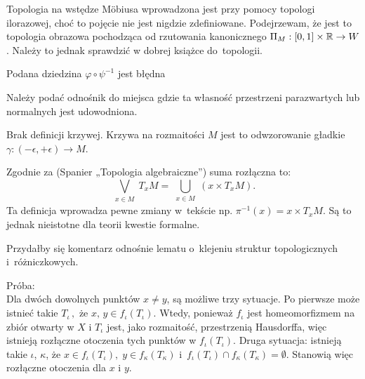 \documentclass[a4paper,11pt]{article}
\begin{document}
\vspace{\spaceFour}



\start {} Topologia na wstędze M\"{o}biusa wprowadzona jest przy
pomocy topologi ilorazowej, choć to pojęcie nie jest nigdzie
zdefiniowane. Podejrzewam, że jest to topologia obrazowa pochodząca od
rzutowania kanonicznego
$\Pi_{ M } : [ 0,1 ] \times \mathbb{R} \to W$. Należy to jednak
sprawdzić w dobrej książce do~topologii.

\vspace{\spaceFour}



\start {} Podana dziedzina $\varphi \circ \psi^{ -1 }$ jest
błędna 

\vspace{\spaceFour}



\start {} Należy podać odnośnik do miejsca gdzie ta własność
przestrzeni parazwartych lub normalnych jest udowodniona.

\vspace{\spaceFour}



\start {} Brak definicji krzywej. Krzywa na rozmaitości $M$ jest
to odwzorowanie gładkie $\gamma : ( -\epsilon, +\epsilon ) \to M$.

\vspace{\spaceFour}



\start {} Zgodnie za \cite{} (Spanier „Topologia algebraiczne”) suma
rozłączna to:
\begin{equation}
  \label{eq:GancarzewiczZWGR-s01-01}
  \bigvee_{ \substack{ x \in M } } T_{ x } M
  = \bigcup_{ \substack{ x \in M } }( x \times T_{ x } M ).
\end{equation}
Ta definicja wprowadza pewne zmiany w~tekście np.
$\pi^{ -1 }( x ) = x \times T_{ x }M$. Są to jednak nieistotne dla
teorii kwestie formalne.

\vspace{\spaceFour}



\start {} Przydałby się komentarz odnośnie lematu o~klejeniu
struktur topologicznych i~różniczkowych.

Próba: \\
Dla dwóch dowolnych punktów $x \neq y$, są możliwe trzy sytuacje. Po
pierwsze może istnieć takie $T_{ \iota } \, ,$ że
$x, \, y \in f_{ \iota }( T_{ \iota } )$. Wtedy, ponieważ
$f_{ \iota }$ jest homeomorfizmem na zbiór otwarty w $X$ i $T_{ \iota }$
jest, jako rozmaitość, przestrzenią Hausdorffa, więc istnieją
rozłączne otoczenia tych punktów w $f_{ \iota } ( T_{ \iota } )$.
Druga sytuacja: istnieją takie $\iota$, $\kappa$, że
$x \in f_{ \iota } ( T_{ \iota } ), \; y \in f_{ \kappa } ( T_{ \kappa } )$
i~$f_{ \iota } ( T_{ \iota } ) \cap f_{ \kappa } ( T_{ \kappa } ) = \emptyset$.
Stanowią więc rozłączne otoczenia dla $x$ i $y$.
\end{document}
